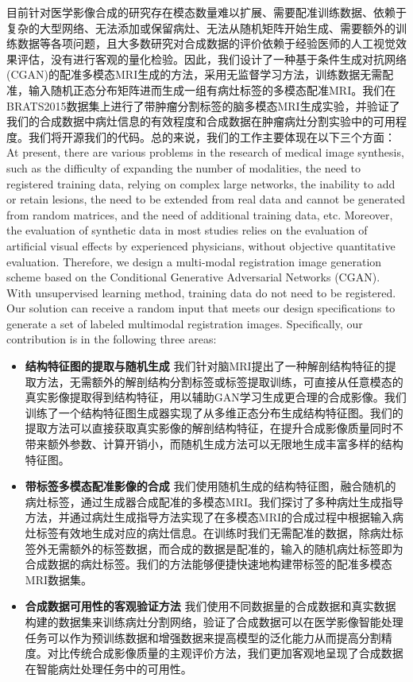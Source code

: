 \documentclass[letterpaper]{article} %
\begin{document}
目前针对医学影像合成的研究存在模态数量难以扩展、需要配准训练数据、依赖于复杂的大型网络、无法添加或保留病灶、无法从随机矩阵开始生成、需要额外的训练数据等各项问题，且大多数研究对合成数据的评价依赖于经验医师的人工视觉效果评估，没有进行客观的量化检验。因此，我们设计了一种基于条件生成对抗网络(CGAN)\cite{70mirza2014conditional}的配准多模态MRI生成的方法，采用无监督学习方法，训练数据无需配准，输入随机正态分布矩阵进而生成一组有病灶标签的多模态配准MRI。我们在BRATS2015数据集上进行了带肿瘤分割标签的脑多模态MRI生成实验，并验证了我们的合成数据中病灶信息的有效程度和合成数据在肿瘤病灶分割实验中的可用程度。我们将开源我们的代码。总的来说，我们的工作主要体现在以下三个方面：
At present, there are various problems in the research of medical image synthesis, such as the difficulty of expanding the number of modalities, the need to registered training data, relying on complex large networks, the inability to add or retain lesions, the need to be extended from real data and cannot be generated from random matrices, and the need of additional training data, etc. Moreover, the evaluation of synthetic data in most studies relies on the evaluation of artificial visual effects by experienced physicians, without objective quantitative evaluation. Therefore, we design a multi-modal registration image generation scheme based on the Conditional Generative Adversarial Networks (CGAN)\cite{70mirza2014conditional}. With unsupervised learning method, training data do not need to be registered. Our solution can receive a random input that meets our design specifications to generate a set of labeled multimodal registration images. Specifically, our contribution is in the following three areas:

\begin{itemize}
	\item \textbf{结构特征图的提取与随机生成}
	我们针对脑MRI提出了一种解剖结构特征的提取方法，无需额外的解剖结构分割标签或标签提取训练，可直接从任意模态的真实影像提取得到结构特征，用以辅助GAN学习生成更合理的合成影像。我们训练了一个结构特征图生成器实现了从多维正态分布生成结构特征图。我们的提取方法可以直接获取真实影像的解剖结构特征，在提升合成影像质量同时不带来额外参数、计算开销小，而随机生成方法可以无限地生成丰富多样的结构特征图。
	\item \textbf{带标签多模态配准影像的合成}
	我们使用随机生成的结构特征图，融合随机的病灶标签，通过生成器合成配准的多模态MRI。我们探讨了多种病灶生成指导方法，并通过病灶生成指导方法实现了在多模态MRI的合成过程中根据输入病灶标签有效地生成对应的病灶信息。在训练时我们无需配准的数据，除病灶标签外无需额外的标签数据，而合成的数据是配准的，输入的随机病灶标签即为合成数据的病灶标签。我们的方法能够便捷快速地构建带标签的配准多模态MRI数据集。
	\item \textbf{合成数据可用性的客观验证方法}
	我们使用不同数据量的合成数据和真实数据构建的数据集来训练病灶分割网络，验证了合成数据可以在医学影像智能处理任务可以作为预训练数据和增强数据来提高模型的泛化能力从而提高分割精度。对比传统合成影像质量的主观评价方法，我们更加客观地呈现了合成数据在智能病灶处理任务中的可用性。
\end{itemize}
\end{document}
